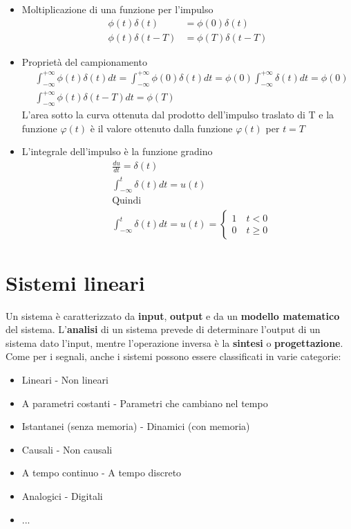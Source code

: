 \documentclass[a4paper, titlepage, oneside]{scrbook}
\begin{document}
\begin{itemize}
	\item Moltiplicazione di una funzione per l'impulso
	\begin{align*}
	\phi(t)\delta(t)&=\phi(0)\delta(t)\\
	\phi(t)\delta(t-T)&=\phi(T)\delta(t-T)
	\end{align*}
	
	\item Proprietà del campionamento
	\begin{align*}
	&\int_{-\infty}^{+\infty} \phi(t)\delta(t)dt=\int_{-\infty}^{+\infty} \phi(0)\delta(t)dt=\phi(0)\int_{-\infty}^{+\infty} \delta(t)dt=\phi(0)\\
	&\int_{-\infty}^{+\infty} \phi(t)\delta(t-T)dt=\phi(T)
	\end{align*}
	L'area sotto la curva ottenuta dal prodotto dell'impulso traslato di T e la funzione $\varphi(t)$ è il valore ottenuto dalla funzione $\varphi(t)$ per $t=T$
	
	\item L'integrale dell'impulso è la funzione gradino
	\begin{align*}
		&\frac{du}{dt}=\delta(t)\\
		&\int_{-\infty}^{t}\delta(t)dt=u(t)\\
		&\text{Quindi}\\
		&\int_{-\infty}^{t}\delta(t)dt=u(t)=
		\left\{
		\begin{array}{ll}
		1 \quad t<0\\
		0 \quad t\geq0
		\end{array}
		\right.
	\end{align*}
\end{itemize}

\section{Sistemi lineari}
Un sistema è caratterizzato da \textbf{input}, \textbf{output} e da un \textbf{modello matematico} del sistema. L'\textbf{analisi} di un sistema prevede di determinare l'output di un sistema dato l'input, mentre l'operazione inversa è la \textbf{sintesi} o \textbf{progettazione}.
Come per i segnali, anche i sistemi possono essere classificati in varie categorie:
\begin{itemize}
	\item Lineari - Non lineari
	\item A parametri costanti - Parametri che cambiano nel tempo
	\item Istantanei (senza memoria) - Dinamici (con memoria)
	\item Causali - Non causali
	\item A tempo continuo - A tempo discreto
	\item Analogici - Digitali
	\item ...
\end{itemize}
\end{document}
